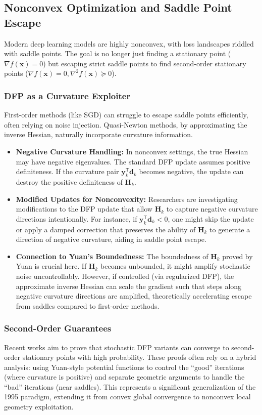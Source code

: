 \documentclass[12pt,a4paper]{article}  %
\newcounter{cite}
\theoremstyle{definition}
\numberwithin{equation}{section}
\newcommand{\HH}{\bm{H}}
\newcommand{\yy}{\bm{y}}
\newcommand{\trans}{{\scriptstyle{\mathsf{T}}}}
\newcommand{\dd}{\mathbf{d}}
\newcommand{\xx}{\mathbf{x}}
\begin{document}
\subsection{Nonconvex Optimization and Saddle Point Escape}
Modern deep learning models are highly nonconvex, with loss landscapes riddled with saddle points. The goal is no longer just finding a stationary point ($\nabla f(\xx) = 0$) but escaping strict saddle points to find second-order stationary points ($\nabla f(\xx) = 0, \nabla^2 f(\xx) \succeq 0$).

\subsubsection{DFP as a Curvature Exploiter}
First-order methods (like SGD) can struggle to escape saddle points efficiently, often relying on noise injection. Quasi-Newton methods, by approximating the inverse Hessian, naturally incorporate curvature information.
\begin{itemize}
    \item \textbf{Negative Curvature Handling:} In nonconvex settings, the true Hessian may have negative eigenvalues. The standard DFP update assumes positive definiteness. If the curvature pair $\yy_k^\trans \dd_k$ becomes negative, the update can destroy the positive definiteness of $\HH_k$.
    \item \textbf{Modified Updates for Nonconvexity:} Researchers are investigating modifications to the DFP update that allow $\HH_k$ to capture negative curvature directions intentionally. For instance, if $\yy_k^\trans \dd_k < 0$, one might skip the update or apply a damped correction that preserves the ability of $\HH_k$ to generate a direction of negative curvature, aiding in saddle point escape.
    \item \textbf{Connection to Yuan's Boundedness:} The boundedness of $\HH_k$ proved by Yuan \cite{yuan1995} is crucial here. If $\HH_k$ becomes unbounded, it might amplify stochastic noise uncontrollably. However, if controlled (via regularized DFP), the approximate inverse Hessian can scale the gradient such that steps along negative curvature directions are amplified, theoretically accelerating escape from saddles compared to first-order methods.
\end{itemize}

\subsubsection{Second-Order Guarantees}
Recent works aim to prove that stochastic DFP variants can converge to second-order stationary points with high probability. These proofs often rely on a hybrid analysis: using Yuan-style potential functions to control the ``good'' iterations (where curvature is positive) and separate geometric arguments to handle the ``bad'' iterations (near saddles). This represents a significant generalization of the 1995 paradigm, extending it from convex global convergence to nonconvex local geometry exploitation.
\end{document}
